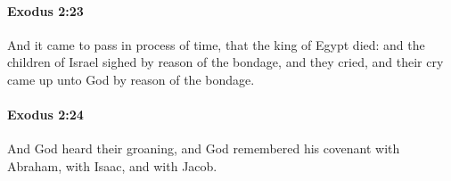 		\paragraph{Exodus 2:23} %
			\label{EXODUS-2-23}

			And it came to pass in process of time, that the king of Egypt died: and the children of Israel sighed by reason of the bondage, and they cried, and their cry came up unto God by reason of the bondage.


		\paragraph{Exodus 2:24} %
			\label{EXODUS-2-24}

			And God heard their groaning, and God remembered his covenant with Abraham, with Isaac, and with Jacob.


